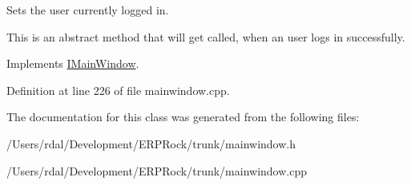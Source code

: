 \-Sets the user currently logged in. 

\-This is an abstract method that will get called, when an user logs in successfully. 

\-Implements \hyperlink{class_i_main_window_a611322565db0eb0985a025451a94c2fe}{\-I\-Main\-Window}.



\-Definition at line 226 of file mainwindow.\-cpp.



\-The documentation for this class was generated from the following files\-:\begin{DoxyCompactItemize}
\item 
/\-Users/rdal/\-Development/\-E\-R\-P\-Rock/trunk/mainwindow.\-h\item 
/\-Users/rdal/\-Development/\-E\-R\-P\-Rock/trunk/mainwindow.\-cpp\end{DoxyCompactItemize}
